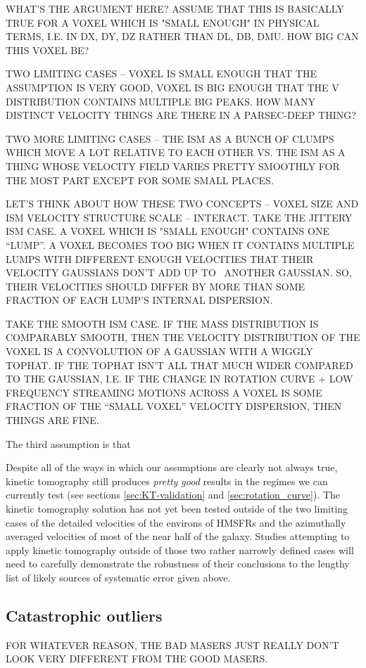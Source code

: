WHAT'S THE ARGUMENT HERE? ASSUME THAT THIS IS BASICALLY TRUE FOR A VOXEL WHICH IS "SMALL ENOUGH" IN PHYSICAL TERMS, I.E. IN DX, DY, DZ RATHER THAN DL, DB, DMU. HOW BIG CAN THIS VOXEL BE? 

TWO LIMITING CASES -- VOXEL IS SMALL ENOUGH THAT THE ASSUMPTION IS VERY GOOD, VOXEL IS BIG ENOUGH THAT THE V DISTRIBUTION CONTAINS MULTIPLE BIG PEAKS. HOW MANY DISTINCT VELOCITY THINGS ARE THERE IN A PARSEC-DEEP THING?

TWO MORE LIMITING CASES -- THE ISM AS A BUNCH OF CLUMPS WHICH MOVE A LOT RELATIVE TO EACH OTHER VS. THE ISM AS A THING WHOSE VELOCITY FIELD VARIES PRETTY SMOOTHLY FOR THE MOST PART EXCEPT FOR SOME SMALL PLACES. 

LET'S THINK ABOUT HOW THESE TWO CONCEPTS -- VOXEL SIZE AND ISM VELOCITY STRUCTURE SCALE -- INTERACT. 
TAKE THE JITTERY ISM CASE. A VOXEL WHICH IS "SMALL ENOUGH" CONTAINS ONE ``LUMP''. A VOXEL BECOMES TOO BIG WHEN IT CONTAINS MULTIPLE LUMPS WITH DIFFERENT ENOUGH VELOCITIES THAT THEIR VELOCITY GAUSSIANS DON'T ADD UP TO ~ANOTHER GAUSSIAN. SO, THEIR VELOCITIES SHOULD DIFFER BY MORE THAN SOME FRACTION OF EACH LUMP'S INTERNAL DISPERSION. 

TAKE THE SMOOTH ISM CASE. IF THE MASS DISTRIBUTION IS COMPARABLY SMOOTH, THEN THE VELOCITY DISTRIBUTION OF THE VOXEL IS A CONVOLUTION OF A GAUSSIAN WITH A WIGGLY TOPHAT. IF THE TOPHAT ISN'T ALL THAT MUCH WIDER COMPARED TO THE GAUSSIAN, I.E. IF THE CHANGE IN ROTATION CURVE + LOW FREQUENCY STREAMING MOTIONS ACROSS A VOXEL IS SOME FRACTION OF THE ``SMALL VOXEL'' VELOCITY DISPERSION, THEN THINGS ARE FINE. 


The third assumption is that 



Despite all of the ways in which our assumptions are clearly not always true, kinetic tomography still produces \emph{pretty good} results in the regimes we can currently test (see sections \ref{sec:KT-validation} and \ref{sec:rotation_curve}). 
The kinetic tomography solution has not yet been tested outside of the two limiting cases of the detailed velocities of the environs of HMSFRs and the azimuthally averaged velocities of most of the near half of the galaxy.
Studies attempting to apply kinetic tomography outside of those two rather narrowly defined cases will need to carefully demonstrate the robustness of their conclusions to the lengthy list of likely sources of systematic error given above.

\subsection{Catastrophic outliers}
\label{sec:discussion-catastrophic}
FOR WHATEVER REASON, THE BAD MASERS JUST REALLY DON'T LOOK VERY DIFFERENT FROM THE GOOD MASERS. 


